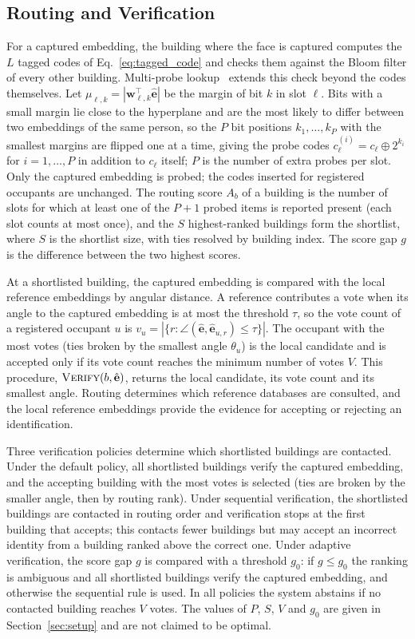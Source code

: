 \documentclass[pdflatex,sn-mathphys-num]{sn-jnl}%
\theoremstyle{thmstyleone}%
\theoremstyle{thmstyletwo}%
\theoremstyle{thmstylethree}%
\begin{document}
\subsection{Routing and Verification}
\label{subsec:routing_verification}

For a captured embedding, the building where the face is captured computes the $L$ tagged codes of Eq.~\eqref{eq:tagged_code} and checks them against the Bloom filter of every other building. Multi-probe lookup~\cite{lv2007} extends this check beyond the codes themselves. Let $\mu_{\ell,k}=|\mathbf{w}_{\ell,k}^\top\hat{\mathbf{e}}|$ be the margin of bit $k$ in slot $\ell$. Bits with a small margin lie close to the hyperplane and are the most likely to differ between two embeddings of the same person, so the $P$ bit positions $k_1,\ldots,k_P$ with the smallest margins are flipped one at a time, giving the probe codes $c_\ell^{(i)}=c_\ell\oplus 2^{k_i}$ for $i=1,\ldots,P$ in addition to $c_\ell$ itself; $P$ is the number of extra probes per slot. Only the captured embedding is probed; the codes inserted for registered occupants are unchanged. The routing score $A_b$ of a building is the number of slots for which at least one of the $P+1$ probed items is reported present (each slot counts at most once), and the $S$ highest-ranked buildings form the shortlist, where $S$ is the shortlist size, with ties resolved by building index. The score gap $g$ is the difference between the two highest scores.

At a shortlisted building, the captured embedding is compared with the local reference embeddings by angular distance. A reference contributes a vote when its angle to the captured embedding is at most the threshold $\tau$, so the vote count of a registered occupant $u$ is $v_u=|\{r:\angle(\hat{\mathbf{e}},\hat{\mathbf{e}}_{u,r})\leq\tau\}|$. The occupant with the most votes (ties broken by the smallest angle $\theta_u$) is the local candidate and is accepted only if its vote count reaches the minimum number of votes $V$. This procedure, $\textsc{Verify}(b,\hat{\mathbf{e}})$, returns the local candidate, its vote count and its smallest angle. Routing determines which reference databases are consulted, and the local reference embeddings provide the evidence for accepting or rejecting an identification.

Three verification policies determine which shortlisted buildings are contacted. Under the default policy, all shortlisted buildings verify the captured embedding, and the accepting building with the most votes is selected (ties are broken by the smaller angle, then by routing rank). Under sequential verification, the shortlisted buildings are contacted in routing order and verification stops at the first building that accepts; this contacts fewer buildings but may accept an incorrect identity from a building ranked above the correct one. Under adaptive verification, the score gap $g$ is compared with a threshold $g_0$: if $g\le g_0$ the ranking is ambiguous and all shortlisted buildings verify the captured embedding, and otherwise the sequential rule is used. In all policies the system abstains if no contacted building reaches $V$ votes. The values of $P$, $S$, $V$ and $g_0$ are given in Section~\ref{sec:setup} and are not claimed to be optimal.
\end{document}
